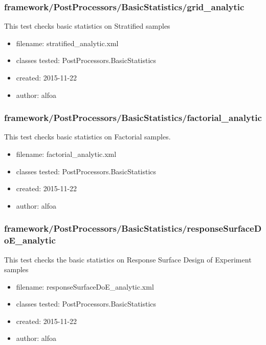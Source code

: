     \subsubsection{framework/PostProcessors/BasicStatistics/grid\_analytic}
      
      This test checks basic statistics on Stratified samples
    
      \begin{itemize}
          \item filename: stratified\_analytic.xml
          \item classes tested: PostProcessors.BasicStatistics
          \item created: 2015-11-22
          \item author: alfoa
      \end{itemize}
    \subsubsection{framework/PostProcessors/BasicStatistics/factorial\_analytic}
      
      This test checks basic statistics on Factorial samples.
    
      \begin{itemize}
          \item filename: factorial\_analytic.xml
          \item classes tested: PostProcessors.BasicStatistics
          \item created: 2015-11-22
          \item author: alfoa
      \end{itemize}
    \subsubsection{framework/PostProcessors/BasicStatistics/responseSurfaceDoE\_analytic}
      
      This test checks the basic statistics on Response Surface Design of Experiment samples
    
      \begin{itemize}
          \item filename: responseSurfaceDoE\_analytic.xml
          \item classes tested: PostProcessors.BasicStatistics
          \item created: 2015-11-22
          \item author: alfoa
      \end{itemize}
